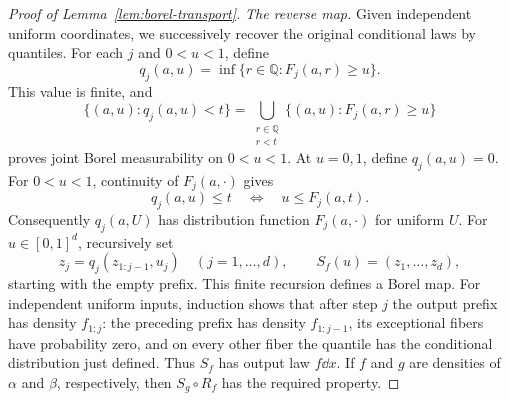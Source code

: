\begin{proof}[Proof of Lemma~\ref{lem:borel-transport}]
\emph{The reverse map.}
Given independent uniform coordinates, we successively recover the
original conditional laws by quantiles. For each \(j\)
and \(0<u<1\), define
\[
 q_j(a,u)=\inf\{r\in\mathbb Q:F_j(a,r)\ge u\}.
\]
This value is finite, and
\[
 \{(a,u):q_j(a,u)<t\}
 =\bigcup_{\substack{r\in\mathbb Q\\r<t}}
      \{(a,u):F_j(a,r)\ge u\}
\]
proves joint Borel measurability on \(0<u<1\). At \(u=0,1\), define
\(q_j(a,u)=0\). For \(0<u<1\), continuity of \(F_j(a,\cdot)\) gives
\[
 q_j(a,u)\le t\quad\Longleftrightarrow\quad u\le F_j(a,t).
\]
Consequently \(q_j(a,U)\) has distribution function \(F_j(a,\cdot)\)
for uniform \(U\).
For \(u\in[0,1]^d\), recursively set
\[
 z_j=q_j(z_{1:j-1},u_j)\quad(j=1,\ldots,d),
 \qquad S_f(u)=(z_1,\ldots,z_d),
\]
starting with the empty prefix. This finite recursion defines a Borel map.
For independent uniform inputs, induction shows that after step \(j\) the
output prefix has density \(f_{1:j}\): the preceding prefix has density
\(f_{1:j-1}\), its exceptional fibers have probability zero, and on every
other fiber the quantile has the conditional distribution just defined.
Thus \(S_f\) has output law \(f\dd x\).
If \(f\) and \(g\) are densities of \(\alpha\) and \(\beta\), respectively,
then \(S_g\circ R_f\) has the required property.
\end{proof}
